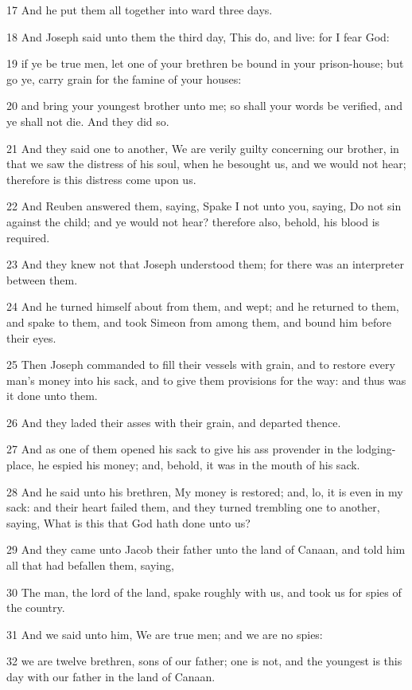 \par 17 And he put them all together into ward three days.
\par 18 And Joseph said unto them the third day, This do, and live: for I fear God:
\par 19 if ye be true men, let one of your brethren be bound in your prison-house; but go ye, carry grain for the famine of your houses:
\par 20 and bring your youngest brother unto me; so shall your words be verified, and ye shall not die. And they did so.
\par 21 And they said one to another, We are verily guilty concerning our brother, in that we saw the distress of his soul, when he besought us, and we would not hear; therefore is this distress come upon us.
\par 22 And Reuben answered them, saying, Spake I not unto you, saying, Do not sin against the child; and ye would not hear? therefore also, behold, his blood is required.
\par 23 And they knew not that Joseph understood them; for there was an interpreter between them.
\par 24 And he turned himself about from them, and wept; and he returned to them, and spake to them, and took Simeon from among them, and bound him before their eyes.
\par 25 Then Joseph commanded to fill their vessels with grain, and to restore every man's money into his sack, and to give them provisions for the way: and thus was it done unto them.
\par 26 And they laded their asses with their grain, and departed thence.
\par 27 And as one of them opened his sack to give his ass provender in the lodging-place, he espied his money; and, behold, it was in the mouth of his sack.
\par 28 And he said unto his brethren, My money is restored; and, lo, it is even in my sack: and their heart failed them, and they turned trembling one to another, saying, What is this that God hath done unto us?
\par 29 And they came unto Jacob their father unto the land of Canaan, and told him all that had befallen them, saying,
\par 30 The man, the lord of the land, spake roughly with us, and took us for spies of the country.
\par 31 And we said unto him, We are true men; and we are no spies:
\par 32 we are twelve brethren, sons of our father; one is not, and the youngest is this day with our father in the land of Canaan.
